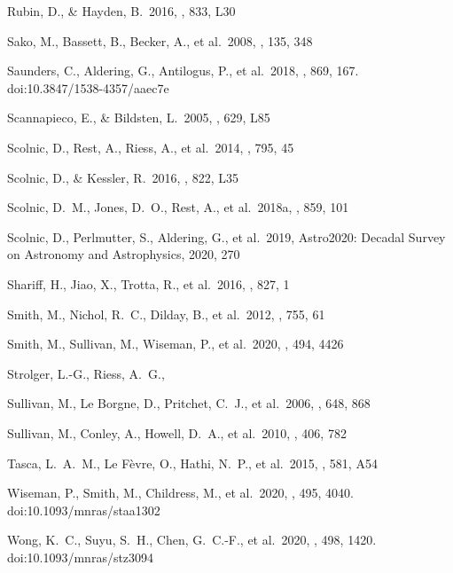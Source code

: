 \documentclass[]{aa}
\begin{document}
\begin{thebibliography}{}
 Rubin, D., \& Hayden, B.\ 2016,
\apjl, 833, L30


 Sako, M., Bassett, B., Becker, A., et al.\
2008, \aj, 135, 348

 Saunders, C., Aldering, G.,
Antilogus, P., et al.\ 2018, \apj, 869, 167. doi:10.3847/1538-4357/aaec7e

 Scannapieco, E., \&
Bildsten, L.\ 2005, \apjl, 629, L85 

 Scolnic, D., Rest, A., Riess, A., et
al.\ 2014, \apj, 795, 45

 Scolnic, D., \& Kessler, R.\
2016, \apjl, 822, L35

 Scolnic, D.~M., Jones, D.~O., Rest,
A., et al.\ 2018a, \apj, 859, 101

 Scolnic, D., Perlmutter, S.,
Aldering, G., et al.\ 2019, Astro2020: Decadal Survey on Astronomy and
Astrophysics, 2020, 270

 Shariff, H., Jiao, X., Trotta, R.,
et al.\ 2016, \apj, 827, 1

 Smith, M., Nichol, R.~C., Dilday, B., et
al.\ 2012, \apj, 755, 61

 Smith, M., Sullivan, M., Wiseman, P., et
al.\ 2020, \mnras, 494, 4426

 Strolger, L.-G., Riess, A.~G.,

\bibitem[Sullivan et al.(2006)]{sullivan2006} Sullivan, M., Le Borgne, D.,
Pritchet, C.~J., et al.\ 2006, \apj, 648, 868 

 Sullivan, M., Conley, A., Howell,
D.~A., et al.\ 2010, \mnras, 406, 782


 Tasca, L.~A.~M., Le F{\`e}vre, O.,
Hathi, N.~P., et al.\ 2015, \aap, 581, A54


 Wiseman, P., Smith, M., Childress,
M., et al.\ 2020, \mnras, 495, 4040. doi:10.1093/mnras/staa1302

\bibitem[Wong et al.(2020)]{wong2019} Wong, K.~C., Suyu, S.~H., Chen, G.~C.-F.,
et al.\ 2020, \mnras, 498, 1420. doi:10.1093/mnras/stz3094

\end{thebibliography}
\end{document}
